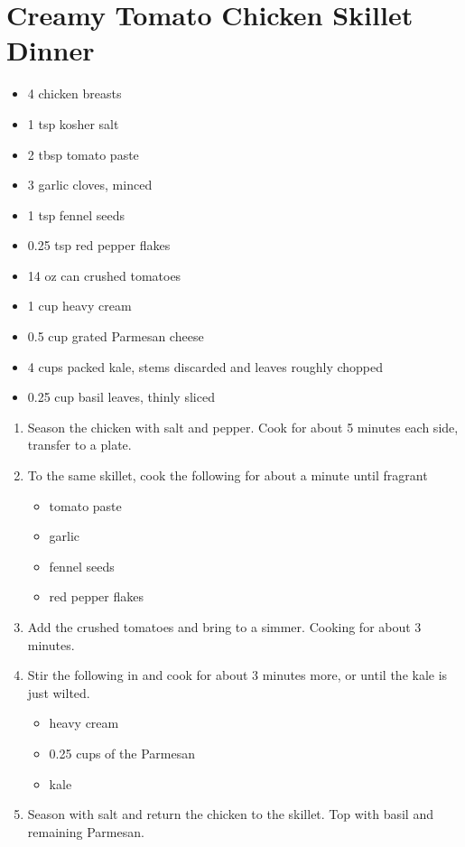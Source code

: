 \section{Creamy Tomato Chicken Skillet Dinner}

\begin{itemize}
\item 4 chicken breasts
\item 1 tsp kosher salt
\item 2 tbsp tomato paste
\item 3 garlic cloves, minced
\item 1 tsp fennel seeds
\item 0.25 tsp red pepper flakes
\item 14 oz can crushed tomatoes
\item 1 cup heavy cream
\item 0.5 cup grated Parmesan cheese
\item 4 cups packed kale, stems discarded and leaves roughly chopped
\item 0.25 cup basil leaves, thinly sliced
\end{itemize}

\begin{enumerate}
\item Season the chicken with salt and pepper. Cook for about 5 minutes each side, transfer to a plate.
\item To the same skillet, cook the following for about a minute until fragrant
\begin{itemize}
    \item tomato paste
    \item garlic
    \item fennel seeds
    \item red pepper flakes
\end{itemize}
\item Add the crushed tomatoes and bring to a simmer. Cooking for about 3 minutes.
\item Stir the following in and cook for about 3 minutes more, or until the kale is just wilted.
\begin{itemize}
    \item heavy cream
    \item 0.25 cups of the Parmesan
    \item kale
\end{itemize}
\item Season with salt and return the chicken to the skillet. Top with basil and remaining Parmesan.
\end{enumerate}
